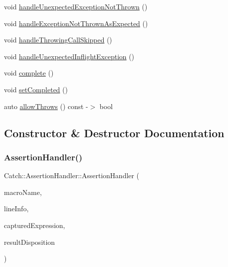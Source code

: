 \begin{DoxyCompactItemize}
void \mbox{\hyperlink{class_catch_1_1_assertion_handler_a7764d0adb6ed5eeb10964f6abc02fab1}{handle\+Unexpected\+Exception\+Not\+Thrown}} ()
\item 
void \mbox{\hyperlink{class_catch_1_1_assertion_handler_a51e4936e3af43b74690cedae6d2e297a}{handle\+Exception\+Not\+Thrown\+As\+Expected}} ()
\item 
void \mbox{\hyperlink{class_catch_1_1_assertion_handler_a67a194d5518f307c4a16faa03a7f7442}{handle\+Throwing\+Call\+Skipped}} ()
\item 
void \mbox{\hyperlink{class_catch_1_1_assertion_handler_aa2504dad6a91f3645e5f52c932c11270}{handle\+Unexpected\+Inflight\+Exception}} ()
\item 
void \mbox{\hyperlink{class_catch_1_1_assertion_handler_a878a9eb828d8a1863c8dcb6575f6f40e}{complete}} ()
\item 
void \mbox{\hyperlink{class_catch_1_1_assertion_handler_a6756bd5395c0ddd28764a9fb4612d5e4}{set\+Completed}} ()
\item 
auto \mbox{\hyperlink{class_catch_1_1_assertion_handler_a193bb3999494c46457f3059184c6b251}{allow\+Throws}} () const -\/$>$ bool
\end{DoxyCompactItemize}


\subsection{Constructor \& Destructor Documentation}
\mbox{\label{class_catch_1_1_assertion_handler_a32efbb1b56b71d758d4c2094bac1f1a9}} 
\subsubsection{\texorpdfstring{Assertion\+Handler()}{AssertionHandler()}}
{\footnotesize\ttfamily Catch\+::\+Assertion\+Handler\+::\+Assertion\+Handler (\begin{DoxyParamCaption}\item[{\mbox{\hyperlink{class_catch_1_1_string_ref}{String\+Ref}} const \&}]{macro\+Name,  }\item[{\mbox{\hyperlink{struct_catch_1_1_source_line_info}{Source\+Line\+Info}} const \&}]{line\+Info,  }\item[{\mbox{\hyperlink{class_catch_1_1_string_ref}{String\+Ref}}}]{captured\+Expression,  }\item[{\mbox{\hyperlink{struct_catch_1_1_result_disposition_a3396cad6e2259af326b3aae93e23e9d8}{Result\+Disposition\+::\+Flags}}}]{result\+Disposition }\end{DoxyParamCaption})}

